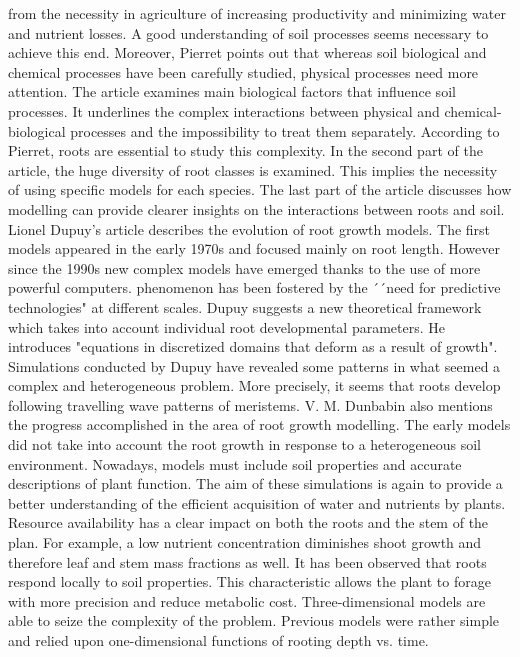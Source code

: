 from the necessity in agriculture of increasing productivity and minimizing water and
nutrient losses. A good understanding of soil processes seems necessary to achieve this
end. Moreover, Pierret points out that whereas soil biological and chemical processes
have been carefully studied, physical processes need more attention. The article examines
main biological factors that influence soil processes. It underlines the complex interactions
between physical and chemical-biological processes and the impossibility to treat them
separately. According to Pierret, roots are essential to study this complexity. In the
second part of the article, the huge diversity of root classes is examined. This implies the
necessity of using specific models for each species. The last part of the article discusses
how modelling can provide clearer insights on the interactions between roots and soil.
Lionel Dupuy’s article describes the evolution of root growth models. The first models
appeared in the early 1970s and focused mainly on root length. However since the 1990s
new complex models have emerged thanks to the use of more powerful computers.
phenomenon has been fostered by the ´´need for predictive technologies" at different scales.
Dupuy suggests a new theoretical framework which takes into account individual root
developmental parameters. He introduces "equations in discretized domains that deform
as a result of growth". Simulations conducted by Dupuy have revealed some patterns in
what seemed a complex and heterogeneous problem. More precisely, it seems that roots
develop following travelling wave patterns of meristems.
V. M. Dunbabin also mentions the progress accomplished in the area of root growth
modelling. The early models did not take into account the root growth in response to
a heterogeneous soil environment. Nowadays, models must include soil properties and
accurate descriptions of plant function. The aim of these simulations is again to provide a better understanding of the efficient acquisition of water and nutrients by plants. Resource
availability has a clear impact on both the roots and the stem of the plan. For example,
a low nutrient concentration diminishes shoot growth and therefore leaf and stem mass
fractions as well. It has been observed that roots respond locally to soil properties. This
characteristic allows the plant to forage with more precision and reduce metabolic cost.
Three-dimensional models are able to seize the complexity of the problem. Previous
models were rather simple and relied upon one-dimensional functions of rooting depth vs.
time.
